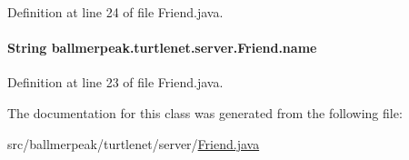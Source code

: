 Definition at line 24 of file Friend.\-java.

\hypertarget{classballmerpeak_1_1turtlenet_1_1server_1_1Friend_a6ca8fa062fdfee5cb31da6408d33fc47}{
\paragraph[{name}]{\setlength{\rightskip}{0pt plus 5cm}String ballmerpeak.\-turtlenet.\-server.\-Friend.\-name\hspace{0.3cm}{\ttfamily [private]}}}\label{classballmerpeak_1_1turtlenet_1_1server_1_1Friend_a6ca8fa062fdfee5cb31da6408d33fc47}


Definition at line 23 of file Friend.\-java.



The documentation for this class was generated from the following file\-:\begin{DoxyCompactItemize}
\item 
src/ballmerpeak/turtlenet/server/\hyperlink{Friend_8java}{Friend.\-java}\end{DoxyCompactItemize}
